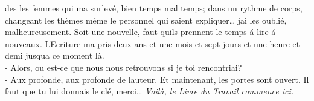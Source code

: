 \documentclass[
]{article}
\begin{document}
des les femmes qui m\textquotesingle a surlevé, bien temps mal temps;
dans un rythme de corps, changeant les thèmes même le personnel qui
saient expliquer\ldots{} j\textquotesingle ai les oublié,
malheureusement. Soit une nouvelle, faut qu\textquotesingle ils prennent
le temps á lire á nouveaux. L\textquotesingle Ecriture
m\textquotesingle a pris deux ans et une mois et sept jours et une heure
et demi jusqu\textquotesingle a ce moment là.\\
- Alors, ou est-ce que nous nous retrouvons si je toi rencontriai?\\
- Aux profonde, aux profonde de l\textquotesingle auteur. Et maintenant,
les portes sont ouvert. Il faut que tu lui donnais le clé, merci\ldots{}
\emph{Voilà, le Livre du Travail commence ici.}
\end{document}
